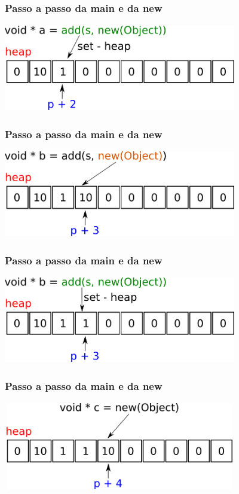 \documentclass{beamer}
\begin{document}
\begin{frame}
 \frametitle{Passo a passo da main e da new}
  \begin{center}
    \includegraphics[height = 1.5in, width = 4in]{image/add_a2.png}
  \end{center}
\end{frame}

\begin{frame}
 \frametitle{Passo a passo da main e da new}
  \begin{center}
    \includegraphics[height = 1.5in, width = 4in]{image/add_b1.png}
  \end{center}
\end{frame}

\begin{frame}
 \frametitle{Passo a passo da main e da new}
  \begin{center}
    \includegraphics[height = 1.5in, width = 4in]{image/add_b2.png}
  \end{center}
\end{frame}

\begin{frame}
 \frametitle{Passo a passo da main e da new}
  \begin{center}
    \includegraphics[height = 1.5in, width = 4in]{image/new_c.png}
  \end{center}
\end{frame}
\end{document}
